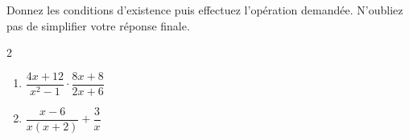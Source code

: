 %
%
    Donnez les conditions d'existence puis effectuez l'opération demandée. N'oubliez pas de simplifier votre réponse finale.
    \begin{multicols}{2}
        \begin{enumerate}
            \item \(\dfrac{4x+12}{x^2 - 1} \cdot \dfrac{8x+8}{2x+6}\) %
            \item \(\dfrac{x-6}{x(x + 2)} + \dfrac{3}{x}\) %
        \end{enumerate}
    \end{multicols}
